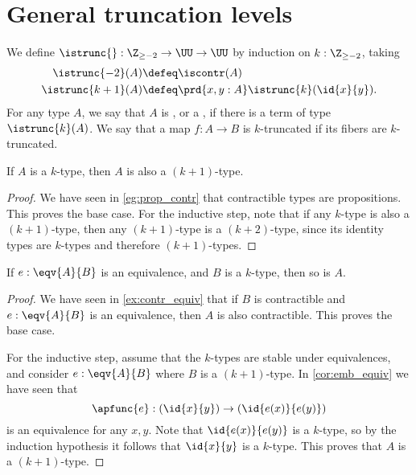 \section{General truncation levels}
\begin{defn}
We define $\istrunc{} : \Z_{\geq-2}\to\UU\to\UU$ by induction on $k:\Z_{\geq -2}$, taking
\begin{align*}
\istrunc{-2}(A) & \defeq \iscontr(A) \\
\istrunc{k+1}(A) & \defeq \prd{x,y:A}\istrunc{k}(\id{x}{y}).\qedhere
\end{align*}
For any type $A$, we say that $A$ is , or a , if there is a term of type $\istrunc{k}(A)$. We say that a map $f:A\to B$ is $k$-truncated if its fibers are $k$-truncated.
\end{defn}


\begin{thm}
If $A$ is a $k$-type, then $A$ is also a $(k+1)$-type.
\end{thm}

\begin{proof}
We have seen in \cref{eg:prop_contr} that contractible types are propositions. This proves the base case.
For the inductive step, note that if any $k$-type is also a $(k+1)$-type, then any $(k+1)$-type is a $(k+2)$-type, since its identity types are $k$-types and therefore $(k+1)$-types.
\end{proof}

\begin{thm}\label{thm:ktype_eqv}
If $e:\eqv{A}{B}$ is an equivalence, and $B$ is a $k$-type, then so is $A$.
\end{thm}

\begin{proof}
We have seen in \autoref{ex:contr_equiv} that if $B$ is contractible and $e:\eqv{A}{B}$ is an equivalence, then $A$ is also contractible. This proves the base case.

For the inductive step, assume that the $k$-types are stable under equivalences, and consider $e:\eqv{A}{B}$ where $B$ is a $(k+1)$-type. In \autoref{cor:emb_equiv} we have seen that
\begin{equation*}
\apfunc{e}:(\id{x}{y})\to(\id{e(x)}{e(y)})
\end{equation*}
is an equivalence for any $x,y$. Note that $\id{e(x)}{e(y)}$ is a $k$-type, so by the induction hypothesis it follows that $\id{x}{y}$ is a $k$-type. This proves that $A$ is a $(k+1)$-type.
\end{proof}


